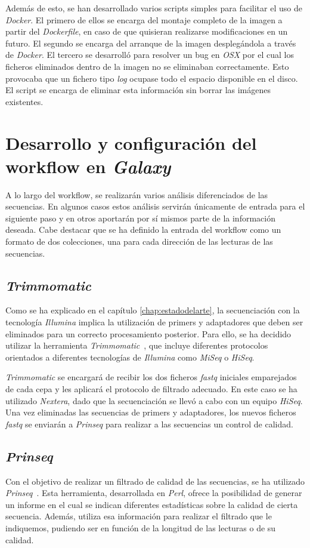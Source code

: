 Además de esto, se han desarrollado varios scripts simples para facilitar el uso de \textit{Docker}. El primero de ellos se encarga del montaje completo de la imagen a partir del \textit{Dockerfile}, en caso de que quisieran realizarse modificaciones en un futuro. El segundo se encarga del arranque de la imagen desplegándola a través de \textit{Docker}. El tercero se desarrolló para resolver un bug en \textit{OSX} por el cual los ficheros eliminados dentro de la imagen no se eliminaban correctamente. Esto provocaba que un fichero tipo \textit{log} ocupase todo el espacio disponible en el disco. El script se encarga de eliminar esta información sin borrar las imágenes existentes.


\section{Desarrollo y configuración del workflow en \itshape{Galaxy}}
A lo largo del workflow, se realizarán varios análisis diferenciados de las secuencias. En algunos casos estos análisis servirán  únicamente de entrada para el siguiente paso y en otros aportarán por sí mismos parte de la información deseada. 
Cabe destacar que se ha definido la entrada del workflow como un formato de dos colecciones, una para cada dirección de las lecturas de las secuencias. 

\subsection{\itshape{Trimmomatic}}
Como se ha explicado en el capítulo \ref{chap:estadodelarte}, la secuenciación con la tecnología \textit{Illumina} implica la utilización de primers y adaptadores que deben ser eliminados para un correcto procesamiento posterior. Para ello, se ha decidido utilizar la herramienta \textit{Trimmomatic}~\cite{Bolger2014}, que incluye diferentes protocolos orientados a diferentes tecnologías de \textit{Illumina} como \textit{MiSeq} o \textit{HiSeq}.

\textit{Trimmomatic} se encargará de recibir los dos ficheros \textit{fastq} iniciales emparejados de cada cepa y les aplicará el protocolo de filtrado adecuado. En este caso se ha utilizado \textit{Nextera}, dado que la secuenciación se llevó a cabo con un equipo \textit{HiSeq}. Una vez eliminadas las secuencias de primers y adaptadores, los nuevos ficheros \textit{fastq} se enviarán a \textit{Prinseq} para realizar a las secuencias un control de calidad.

\subsection{\itshape{Prinseq}}
Con el objetivo de realizar un filtrado de calidad de las secuencias, se ha utilizado \textit{Prinseq}~\cite{schmieder_prinseq}. Esta herramienta, desarrollada en \textit{Perl}, ofrece la posibilidad de generar un informe en el cual se indican diferentes estadísticas sobre la calidad de cierta secuencia. Además, utiliza esa información para realizar el filtrado que le indiquemos, pudiendo ser en función de la longitud de las lecturas o de su calidad.

